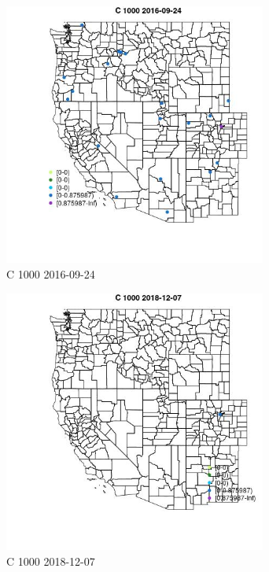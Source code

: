 \begin{figure} 
\centering  
\includegraphics[width=0.77\textwidth]{Code_Outputs/Report_ML_input_PM25_Step4_part_e_de_duplicated_aves_MapObsC_10002016-09-24.jpg} 
\caption{\label{fig:Report_ML_input_PM25_Step4_part_e_de_duplicated_avesMapObsC_10002016-09-24}C 1000 2016-09-24} 
\end{figure} 
 

\clearpage 

\begin{figure} 
\centering  
\includegraphics[width=0.77\textwidth]{Code_Outputs/Report_ML_input_PM25_Step4_part_e_de_duplicated_aves_MapObsC_10002018-12-07.jpg} 
\caption{\label{fig:Report_ML_input_PM25_Step4_part_e_de_duplicated_avesMapObsC_10002018-12-07}C 1000 2018-12-07} 
\end{figure} 
 

